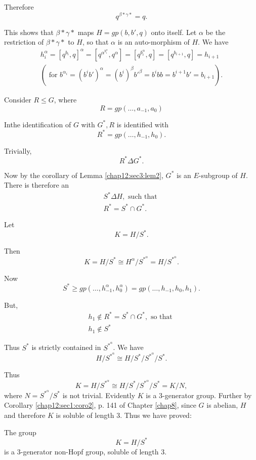 Therefore 
$$
q^{\beta*\gamma*} =q.
$$

This shows that ${\beta*\gamma*}$ maps $H= gp(b, b', q)$ onto
itself. Let $\alpha$ be the restriction of ${\beta*\gamma*}$ to $H$,
so that $\alpha$ is an auto-morphism of $H$. We have  
\begin{multline*}
  h^{\alpha}_i = [q^{b_i}, q]^{\alpha} = \left[q^{\alpha^{b^{\alpha}_i}},
  q^{\alpha}\right]= \left[q^{b^{\alpha}_i}, q \right] = \left[q^{b_{i
        + 1}}, q\right] = h_{i +   1}\\ 
  (\text{ for } b^{\alpha_i}  
  =( b^i b')^{\alpha} = (b^i)^{\beta} b'^{\beta} = b^i bb = b^{i +1 }
  b' = b_{i + 1}). 
\end{multline*}

Consider $R \leq G$, where 
$$
R = gp(\ldots,  a_{-1}, a_0)
$$

In\pageoriginale the identification of $G$ with $G^*, R$ is identified with 
$$
R^* = gp(\ldots,  h_{-1}, h_0).
$$

Trivially,
$$
R^* \Delta G^*.
$$

Now by the corollary of Lemma \ref{chap12:sec3:lem2}, $G^*$ is an $E$-subgroup of
$H$. There is therefore an  
\begin{gather*}
  S^* \Delta H, \text{ such that }\\
  R^* = S^* \cap G^*.
\end{gather*}

Let
$$
K= H/ S^*.
$$

Then 
$$
K = H/ S^* \cong H^{\alpha} / S^{*^{\alpha}} = H/ S^{*^{\alpha}}. 
$$

Now 
$$
S^* \geq gp(\ldots, h^{\alpha}_{-1},h^{\alpha}_{0}) = gp (\ldots,
h_{-1}, h_0, h_1). 
$$

But,\pageoriginale
\begin{gather*}
  h_1 \notin R^* = S^* \cap G^*, \text{ so that }\\
  h_1 \notin S^*
\end{gather*}

Thus $S^*$ is strictly contained in $S^{*^{\alpha}}$. We have 
$$
H/S^{*^{\alpha}} \cong H/S^*/S^{*^{\alpha}}/S^*.
$$

Thus
$$
K = H/S^{*^{\alpha}} \cong H/S^*/S^{*^{\alpha}}/S^* = K/N,
$$
where $N = S^{*^{\alpha}}/S^*$ is not trivial. Evidently $K$ is a
3-generator group. Further by Corollary \ref{chap12:sec1:coro2},
p. 141 of Chapter \ref{chap8}, since 
$G$ is abelian, $H$ and therefore $K$ is soluble of length 3. Thus we
have proved: 
\begin{theorem}\label{chap12:sec4:thm4}%
  The group
  $$
  K= H/ S^*
  $$
  is a 3-generator non-Hopf group, soluble of length 3.
\end{theorem}

